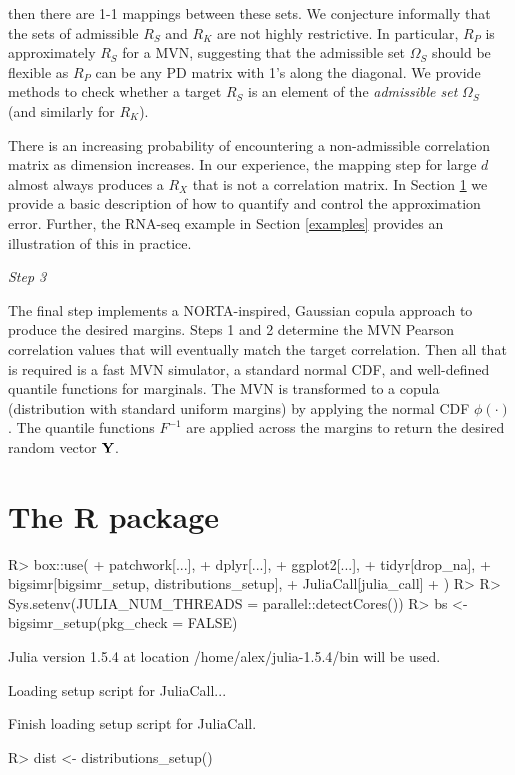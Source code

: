 \documentclass[
]{jss}
\begin{document}
then there are 1-1 mappings between these sets. We conjecture informally that the sets of admissible \(R_S\) and \(R_K\) are not highly restrictive. In particular, \(R_P\) is approximately \(R_S\) for a MVN, suggesting that the admissible set \(\Omega_S\) should be flexible as \(R_P\) can be any PD matrix with 1's along the diagonal. We provide methods to check whether a target \(R_S\) is an element of the \emph{admissible set} \(\Omega_S\) (and similarly for \(R_K\)).

There is an increasing probability of encountering a non-admissible correlation matrix as dimension increases. In our experience, the mapping step for large \(d\) almost always produces a \(R_X\) that is not a correlation matrix. In Section \ref{package} we provide a basic description of how to quantify and control the approximation error. Further, the RNA-seq example in Section \ref{examples} provides an illustration of this in practice.

\emph{Step 3}

The final step implements a NORTA-inspired, Gaussian copula approach to produce the desired margins. Steps 1 and 2 determine the MVN Pearson correlation values that will eventually match the target correlation. Then all that is required is a fast MVN simulator, a standard normal CDF, and well-defined quantile functions for marginals. The MVN is transformed to a copula (distribution with standard uniform margins) by applying the normal CDF \(\phi(\cdot)\). The quantile functions \(F^{-1}\) are applied across the margins to return the desired random vector \({\bf Y}\).

\section[bigsimr-pkg]{The  R package}\label{package}

\begin{CodeChunk}
\begin{CodeInput}
R> box::use(
+   patchwork[...],
+   dplyr[...],
+   ggplot2[...],
+   tidyr[drop_na],
+   bigsimr[bigsimr_setup, distributions_setup],
+   JuliaCall[julia_call]
+ )
R> 
R> Sys.setenv(JULIA_NUM_THREADS = parallel::detectCores())
R> bs <- bigsimr_setup(pkg_check = FALSE)
\end{CodeInput}
\begin{CodeOutput}
Julia version 1.5.4 at location /home/alex/julia-1.5.4/bin will be used.
\end{CodeOutput}
\begin{CodeOutput}
Loading setup script for JuliaCall...
\end{CodeOutput}
\begin{CodeOutput}
Finish loading setup script for JuliaCall.
\end{CodeOutput}
\begin{CodeInput}
R> dist <- distributions_setup()
\end{CodeInput}
\end{CodeChunk}
\end{document}
